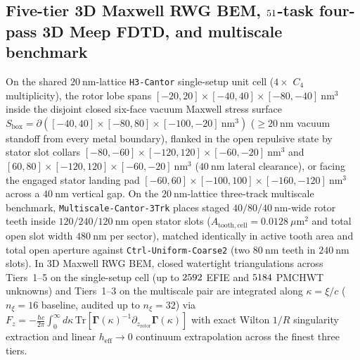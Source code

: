 \documentclass[pdflatex,sn-nature]{sn-jnl}
\begin{document}
\subsection*{Five-tier 3D Maxwell RWG BEM, $51{}$-task four-pass 3D Meep FDTD, and multiscale benchmark}
On the shared $20\ \mathrm{nm}$-lattice \texttt{H3-Cantor} single-setup unit cell ($4\times$ $C_4$ multiplicity), the rotor lobe spans $[-20,20]\times[-40,40]\times[-80,-40]\ \mathrm{nm}^3$ inside the disjoint closed six-face vacuum Maxwell stress surface $S_{\mathrm{box}} = \partial([-40,40]\times[-80,80]\times[-100,-20]\ \mathrm{nm}^3)$ ($\ge 20\ \mathrm{nm}$ vacuum standoff from every metal boundary), flanked in the open repulsive state by stator slot collars $[-80,-60]\times[-120,120]\times[-60,-20]\ \mathrm{nm}^3$ and $[60,80]\times[-120,120]\times[-60,-20]\ \mathrm{nm}^3$ ($40\ \mathrm{nm}$ lateral clearance), or facing the engaged stator landing pad $[-60,60]\times[-100,100]\times[-160,-120]\ \mathrm{nm}^3$ across a $40\ \mathrm{nm}$ vertical gap. On the $20\ \mathrm{nm}$-lattice three-track multiscale benchmark, \texttt{Multiscale-Cantor-3Trk} places staged $40/80/40\ \mathrm{nm}$-wide rotor teeth inside $120/240/120\ \mathrm{nm}$ open stator slots ($A_{\mathrm{tooth,cell}} = 0.0128\ \mu\mathrm{m}^2$ and total open slot width $480\ \mathrm{nm}$ per sector), matched identically in active tooth area and total open aperture against \texttt{Ctrl-Uniform-Coarse2} (two $80\ \mathrm{nm}$ teeth in $240\ \mathrm{nm}$ slots). In 3D Maxwell RWG BEM\cite{rao1982,reid2013pra}, closed watertight triangulations across Tiers~1--5 on the single-setup cell (up to $2592{}$ EFIE and $5184{}$ PMCHWT unknowns) and Tiers~1--3 on the multiscale pair are integrated along $\kappa = \xi/c$ ($n_\xi = 16$ baseline, audited up to $n_\xi = 32$) via $F_z = -\frac{\hbar c}{2\pi}\int_0^\infty d\kappa\,\mathrm{Tr}[\mathbf{\Gamma}(\kappa)^{-1}\partial_{z_{\mathrm{rotor}}}\mathbf{\Gamma}(\kappa)]$ with exact Wilton $1/R$ singularity extraction and linear $h_{\mathrm{eff}} \to 0$ continuum extrapolation across the finest three tiers.
\end{document}
